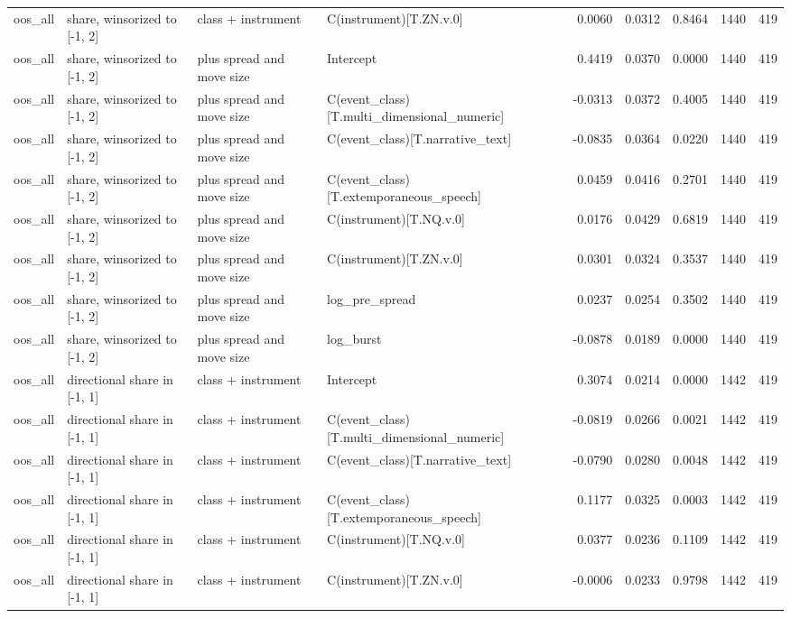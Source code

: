 \begin{tabular}{llllrrrrr}
oos_all & share, winsorized to [-1, 2] & class + instrument & C(instrument)[T.ZN.v.0] & 0.0060 & 0.0312 & 0.8464 & 1440 & 419 \\
oos_all & share, winsorized to [-1, 2] & plus spread and move size & Intercept & 0.4419 & 0.0370 & 0.0000 & 1440 & 419 \\
oos_all & share, winsorized to [-1, 2] & plus spread and move size & C(event_class)[T.multi_dimensional_numeric] & -0.0313 & 0.0372 & 0.4005 & 1440 & 419 \\
oos_all & share, winsorized to [-1, 2] & plus spread and move size & C(event_class)[T.narrative_text] & -0.0835 & 0.0364 & 0.0220 & 1440 & 419 \\
oos_all & share, winsorized to [-1, 2] & plus spread and move size & C(event_class)[T.extemporaneous_speech] & 0.0459 & 0.0416 & 0.2701 & 1440 & 419 \\
oos_all & share, winsorized to [-1, 2] & plus spread and move size & C(instrument)[T.NQ.v.0] & 0.0176 & 0.0429 & 0.6819 & 1440 & 419 \\
oos_all & share, winsorized to [-1, 2] & plus spread and move size & C(instrument)[T.ZN.v.0] & 0.0301 & 0.0324 & 0.3537 & 1440 & 419 \\
oos_all & share, winsorized to [-1, 2] & plus spread and move size & log_pre_spread & 0.0237 & 0.0254 & 0.3502 & 1440 & 419 \\
oos_all & share, winsorized to [-1, 2] & plus spread and move size & log_burst & -0.0878 & 0.0189 & 0.0000 & 1440 & 419 \\
oos_all & directional share in [-1, 1] & class + instrument & Intercept & 0.3074 & 0.0214 & 0.0000 & 1442 & 419 \\
oos_all & directional share in [-1, 1] & class + instrument & C(event_class)[T.multi_dimensional_numeric] & -0.0819 & 0.0266 & 0.0021 & 1442 & 419 \\
oos_all & directional share in [-1, 1] & class + instrument & C(event_class)[T.narrative_text] & -0.0790 & 0.0280 & 0.0048 & 1442 & 419 \\
oos_all & directional share in [-1, 1] & class + instrument & C(event_class)[T.extemporaneous_speech] & 0.1177 & 0.0325 & 0.0003 & 1442 & 419 \\
oos_all & directional share in [-1, 1] & class + instrument & C(instrument)[T.NQ.v.0] & 0.0377 & 0.0236 & 0.1109 & 1442 & 419 \\
oos_all & directional share in [-1, 1] & class + instrument & C(instrument)[T.ZN.v.0] & -0.0006 & 0.0233 & 0.9798 & 1442 & 419 \\

\end{tabular}
